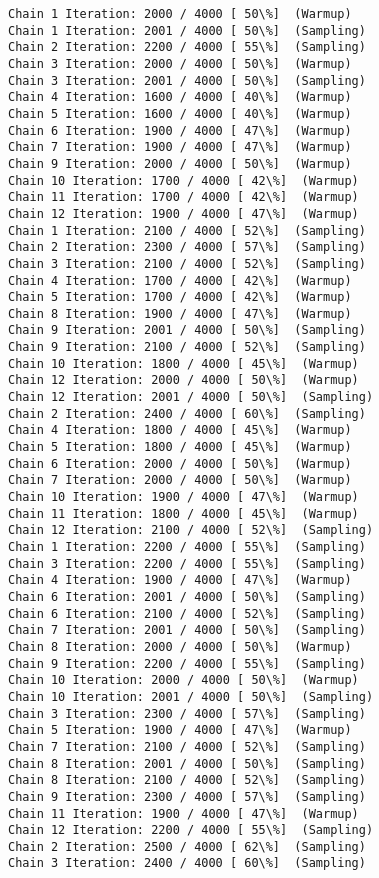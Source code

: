 \documentclass[11pt]{article}
\begin{document}
\begin{Verbatim}[commandchars=\\\{\}]
Chain 1 Iteration: 2000 / 4000 [ 50\%]  (Warmup)
Chain 1 Iteration: 2001 / 4000 [ 50\%]  (Sampling)
Chain 2 Iteration: 2200 / 4000 [ 55\%]  (Sampling)
Chain 3 Iteration: 2000 / 4000 [ 50\%]  (Warmup)
Chain 3 Iteration: 2001 / 4000 [ 50\%]  (Sampling)
Chain 4 Iteration: 1600 / 4000 [ 40\%]  (Warmup)
Chain 5 Iteration: 1600 / 4000 [ 40\%]  (Warmup)
Chain 6 Iteration: 1900 / 4000 [ 47\%]  (Warmup)
Chain 7 Iteration: 1900 / 4000 [ 47\%]  (Warmup)
Chain 9 Iteration: 2000 / 4000 [ 50\%]  (Warmup)
Chain 10 Iteration: 1700 / 4000 [ 42\%]  (Warmup)
Chain 11 Iteration: 1700 / 4000 [ 42\%]  (Warmup)
Chain 12 Iteration: 1900 / 4000 [ 47\%]  (Warmup)
Chain 1 Iteration: 2100 / 4000 [ 52\%]  (Sampling)
Chain 2 Iteration: 2300 / 4000 [ 57\%]  (Sampling)
Chain 3 Iteration: 2100 / 4000 [ 52\%]  (Sampling)
Chain 4 Iteration: 1700 / 4000 [ 42\%]  (Warmup)
Chain 5 Iteration: 1700 / 4000 [ 42\%]  (Warmup)
Chain 8 Iteration: 1900 / 4000 [ 47\%]  (Warmup)
Chain 9 Iteration: 2001 / 4000 [ 50\%]  (Sampling)
Chain 9 Iteration: 2100 / 4000 [ 52\%]  (Sampling)
Chain 10 Iteration: 1800 / 4000 [ 45\%]  (Warmup)
Chain 12 Iteration: 2000 / 4000 [ 50\%]  (Warmup)
Chain 12 Iteration: 2001 / 4000 [ 50\%]  (Sampling)
Chain 2 Iteration: 2400 / 4000 [ 60\%]  (Sampling)
Chain 4 Iteration: 1800 / 4000 [ 45\%]  (Warmup)
Chain 5 Iteration: 1800 / 4000 [ 45\%]  (Warmup)
Chain 6 Iteration: 2000 / 4000 [ 50\%]  (Warmup)
Chain 7 Iteration: 2000 / 4000 [ 50\%]  (Warmup)
Chain 10 Iteration: 1900 / 4000 [ 47\%]  (Warmup)
Chain 11 Iteration: 1800 / 4000 [ 45\%]  (Warmup)
Chain 12 Iteration: 2100 / 4000 [ 52\%]  (Sampling)
Chain 1 Iteration: 2200 / 4000 [ 55\%]  (Sampling)
Chain 3 Iteration: 2200 / 4000 [ 55\%]  (Sampling)
Chain 4 Iteration: 1900 / 4000 [ 47\%]  (Warmup)
Chain 6 Iteration: 2001 / 4000 [ 50\%]  (Sampling)
Chain 6 Iteration: 2100 / 4000 [ 52\%]  (Sampling)
Chain 7 Iteration: 2001 / 4000 [ 50\%]  (Sampling)
Chain 8 Iteration: 2000 / 4000 [ 50\%]  (Warmup)
Chain 9 Iteration: 2200 / 4000 [ 55\%]  (Sampling)
Chain 10 Iteration: 2000 / 4000 [ 50\%]  (Warmup)
Chain 10 Iteration: 2001 / 4000 [ 50\%]  (Sampling)
Chain 3 Iteration: 2300 / 4000 [ 57\%]  (Sampling)
Chain 5 Iteration: 1900 / 4000 [ 47\%]  (Warmup)
Chain 7 Iteration: 2100 / 4000 [ 52\%]  (Sampling)
Chain 8 Iteration: 2001 / 4000 [ 50\%]  (Sampling)
Chain 8 Iteration: 2100 / 4000 [ 52\%]  (Sampling)
Chain 9 Iteration: 2300 / 4000 [ 57\%]  (Sampling)
Chain 11 Iteration: 1900 / 4000 [ 47\%]  (Warmup)
Chain 12 Iteration: 2200 / 4000 [ 55\%]  (Sampling)
Chain 2 Iteration: 2500 / 4000 [ 62\%]  (Sampling)
Chain 3 Iteration: 2400 / 4000 [ 60\%]  (Sampling)

\end{Verbatim}
\end{document}
